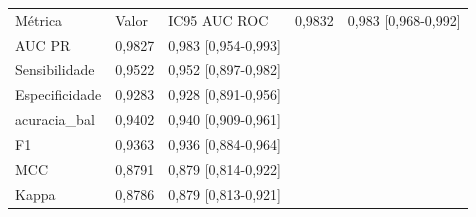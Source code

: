 \begin{tabular}{lll}
\toprule
Métrica & Valor & IC95%
\midrule
AUC ROC & 0,9832 & 0,983 [0,968-0,992] \\
AUC PR & 0,9827 & 0,983 [0,954-0,993] \\
Sensibilidade & 0,9522 & 0,952 [0,897-0,982] \\
Especificidade & 0,9283 & 0,928 [0,891-0,956] \\
acuracia_bal & 0,9402 & 0,940 [0,909-0,961] \\
F1 & 0,9363 & 0,936 [0,884-0,964] \\
MCC & 0,8791 & 0,879 [0,814-0,922] \\
Kappa & 0,8786 & 0,879 [0,813-0,921] \\
\bottomrule
\end{tabular}
